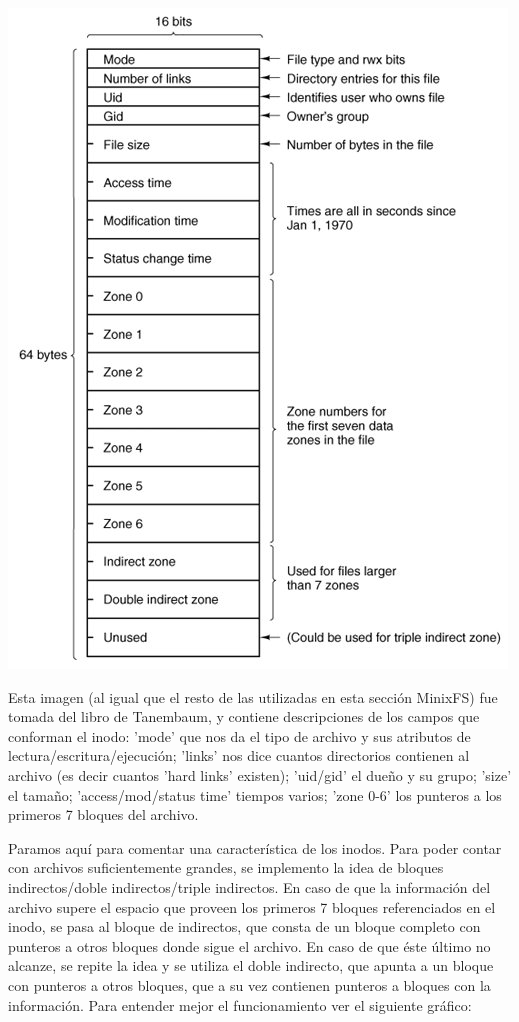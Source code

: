\begin{center}
\includegraphics[scale=0.6]{../img/inode.png}
\end{center}

Esta imagen (al igual que el resto de las utilizadas en esta sección MinixFS)
fue tomada del libro de Tanembaum, y contiene descripciones de los
campos que conforman el inodo: 'mode' que nos da el tipo de archivo y sus
atributos de lectura/escritura/ejecución; 'links' nos dice cuantos directorios
contienen al archivo (es decir cuantos 'hard links' existen); 'uid/gid' el dueño
y su grupo; 'size' el tamaño; 'access/mod/status time' tiempos varios; 'zone
0-6' los punteros a los primeros 7 bloques del archivo.

Paramos aquí para comentar una característica de los inodos. Para poder contar
con archivos suficientemente grandes, se implemento la idea de bloques
indirectos/doble indirectos/triple indirectos. En caso de que la
información del archivo supere el espacio que proveen los primeros 7 bloques
referenciados en el inodo, se pasa al bloque de indirectos, que consta de un
bloque completo con punteros a otros bloques donde sigue el archivo. En caso de
que éste último no alcanze, se repite la idea y se utiliza el doble indirecto,
que apunta a un bloque con punteros a otros bloques, que a su vez contienen
punteros a bloques con la información. Para entender mejor el funcionamiento ver
el siguiente gráfico:

